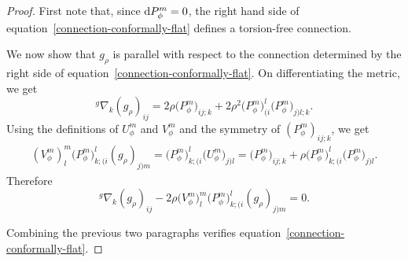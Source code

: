 \documentclass[10pt,a4paper]{amsart}
\numberwithin{equation}{section}
\begin{document}
\begin{proof}
First note that, since ${\rm d}P_\phi^m=0$, the right hand side of equation~\eqref{connection-conformally-flat} defines a torsion-free connection.


We now show that $g_\rho$ is parallel with respect to the connection determined by the right side of equation~\eqref{connection-conformally-flat}. On differentiating the metric, we get
\begin{equation}\label{metric-differential}
^{g}\nabla_{k} (g_\rho)_{i j}=2 \rho \big(P_\phi^m\big)_{i j; k}+2 \rho^{2} \big(P_\phi^m\big)_{(i}^{l} \big(P_\phi^m\big)_{j) l; k}.
\end{equation}
Using the definitions of $U_\phi^m$ and $V_\phi^m$ and the symmetry of $(P_\phi^m)_{ij;k}$, we get
\begin{align*}
(V_\phi^m)_{l}^{m} \big(P_\phi^m\big)_{k;(i}^{l} (g_\rho)_{j) m}=\big(P_\phi^m\big)_{k;(i}^{l} \big(U_\phi^m\big)_{j) l}=\big(P_\phi^m\big)_{i j; k}+\rho \big(P_\phi^m\big)_{k;(i}^{l} \big(P_\phi^m\big)_{j) l}.
\end{align*}
Therefore
\[
{}^g\nabla_{k} (g_\rho)_{i j}-2\rho \big(V_\phi^m\big)_{l}^{m} \big(P_\phi^m\big)_{k;(i}^{l} (g_\rho)_{j) m}=0.
\]

Combining the previous two paragraphs verifies equation~\eqref{connection-conformally-flat}.


\end{proof}
\end{document}
